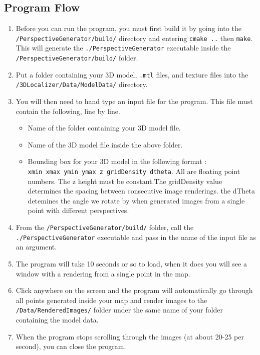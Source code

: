 \documentclass[a4paper,11pt]{article}
\begin{document}
        \subsection{Program Flow}
	\begin{enumerate}
	 \item Before you can run the program, you must first build it by going into the \texttt{/PerspectiveGenerator/build/} directory and entering
	 \texttt{cmake ..} then \texttt{make}.
	 This will generate the \texttt{./PerspectiveGenerator} executable inside the \texttt{/PerspectiveGenerator/build/} folder. 
	 \item Put a folder containing your 3D model, \texttt{.mtl} files, and texture files into the \texttt{/3DLocalizer/Data/ModelData/} directory. 
	 \item You will then need to hand type an input file for the program. This file must contain the following, line by line.
	  \begin{itemize}
	  \item Name of the folder containing your 3D model file.
	  \item Name of the 3D model file inside the above folder.
	  \item Bounding box for your 3D model in the following format : \\ \texttt{xmin xmax ymin ymax z gridDensity dtheta}. All are floating point numbers. 
	  The z height must be constant.The gridDensity value determines the spacing between consecutive image renderings. the dTheta detemines the angle we rotate by when generated images from a single point with different perspectives.
	  \end{itemize}
	\item From the \texttt{/PerspectiveGenerator/build/} folder, call the \texttt{./PerspectiveGenerator} executable and pass in the name of the input file as an argument.
	\item The program will take 10 seconds or so to load, when it does you will see a window with a rendering from a single point in the map. 
	\item Click anywhere on the screen and the program will automatically go through all points generated inside your map and render images to the
	  \texttt{/Data/RenderedImages/} folder
	under the same name of your folder containing the model data.
	\item When the program stops scrolling through the images (at about 20-25 per second), you can close the program.
	\end{enumerate}
\end{document}
